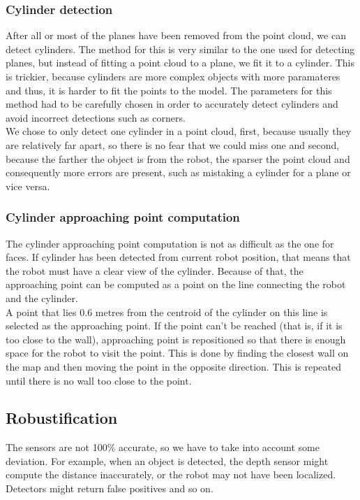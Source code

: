 \documentclass[12pt,a4paper]{article}
\begin{document}
	\subsubsection{Cylinder detection}
	After all or most of the planes have been removed from the point cloud, we can detect cylinders. The method for this is very similar to the one used for detecting planes, but instead of fitting a point cloud to a plane, we fit it to a cylinder. This is trickier, because cylinders are more complex objects with more paramateres and thus, it is harder to fit the points to the model. The parameters for this method had to be carefully chosen in order to accurately detect cylinders and avoid incorrect detections such as corners. \\

	We chose to only detect one cylinder in a point cloud, first, because usually they are relatively far apart, so there is no fear that we could miss one and second, because the farther the object is from the robot, the sparser the point cloud and consequently more errors are present, such as mistaking a cylinder for a plane or vice versa. \\
	
	\subsubsection{Cylinder approaching point computation}
	The cylinder approaching point computation is not as difficult as the one for faces. If cylinder has been detected from current robot position, that means that the robot must have a clear view of the cylinder. Because of that, the approaching point can be computed as a point on the line connecting the robot and the cylinder. \\
	
	A point that lies 0.6 metres from the centroid of the cylinder on this line is selected as the approaching point. If the point can't be reached (that is, if it is too close to the wall), approaching point is repositioned so that there is enough space for the robot to visit the point. This is done by finding the closest wall on the map and then moving the point in the opposite direction. This is repeated until there is no wall too close to the point. \\
	
	\subsection{Robustification} \label{robustification}
	The sensors are not 100\% accurate, so we have to take into account some deviation. For example, when an object is detected, the depth sensor might compute the distance inaccurately, or the robot may not have been localized. Detectors might return false positives and so on. \\
	
\end{document}
